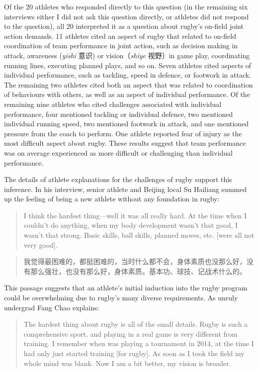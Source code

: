 \begin{CJK}{UTF8}{gbsn}
Of the 20 athletes who responded directly to this question (in the remaining six interviews either I did not ask this question directly, or athletes did not respond to the question), all 20 interpreted it as a question about rugby's on-field joint action demands.  11 athletes cited an aspect of rugby that related to on-field coordination of team performance in joint action, such as decision making in attack, awareness (\textit{yishi} 意识) or vision（\textit{shiye} 视野）in game play, coordinating running lines, executing planned plays, and so on.  Seven athletes cited aspects of individual performance, such as tackling, speed in defence, or footwork in attack. The remaining two athletes cited both an aspect that was related to coordination of behaviours with others, as well as an aspect of individual performance.  Of the remaining nine athletes who cited challenges associated with individual performance, four mentioned tackling or individual defence, two mentioned individual running speed, two mentioned footwork in attack, and one mentioned pressure from the coach to perform.  One athlete reported fear of injury as the most difficult aspect about rugby.  These results suggest that team performance was on average experienced as more difficult or challenging than individual performance.

The details of athlete explanations for the challenges of rugby support this inference.  In his interview, senior athlete and Beijing local Su Hailiang summed up the feeling of being a new athlete without any foundation in rugby:

\begin{quote}
    I think the hardest thing---well it was all really hard.  At the time when I couldn't do anything, when my body development wasn't that good, I wasn't that strong.  Basic skills, ball skills, planned moves, etc. [were all not very good].
\end{quote}

\begin{quote}
    我觉得最困难的，都挺困难的，当时什么都不会，身体素质也没那么好，没有那么强壮，也没有那么好，身体素质。基本功、球技、记战术什么的。
\end{quote}

This passage suggests that an athlete's initial induction into the rugby program could be overwhelming due to rugby's many diverse requirements.  As unruly undergrad Fang Chao explains:

\begin{quote}
  The hardest thing about rugby is all of the small details. Rugby is such a comprehensive sport, and playing in a real game is very different from training. I remember when was playing a tournament in 2014, at the time I had only just started training [for rugby].  As soon as I took the field my whole mind was blank.  Now I am a bit better, my vision is broader.
\end{quote}


\end{CJK}
